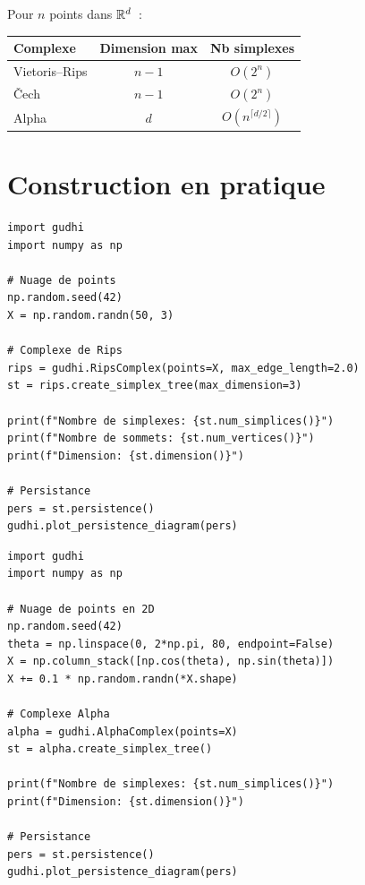 \begin{formules}[title=\textbf{Comparaison des tailles}]
Pour $n$ points dans $\mathbb{R}^d$~:
\begin{center}
\begin{tabular}{lcc}
\toprule
\textbf{Complexe} & \textbf{Dimension max} & \textbf{Nb simplexes} \\
\midrule
Vietoris--Rips & $n - 1$ & $O(2^n)$ \\
\v{C}ech & $n - 1$ & $O(2^n)$ \\
Alpha & $d$ & $O(n^{\lceil d/2 \rceil})$ \\
\bottomrule
\end{tabular}
\end{center}
\end{formules}

\section{Construction en pratique}

\begin{codeblock}[title=\textbf{Complexe de Rips avec GUDHI}]
\begin{verbatim}
import gudhi
import numpy as np

# Nuage de points
np.random.seed(42)
X = np.random.randn(50, 3)

# Complexe de Rips
rips = gudhi.RipsComplex(points=X, max_edge_length=2.0)
st = rips.create_simplex_tree(max_dimension=3)

print(f"Nombre de simplexes: {st.num_simplices()}")
print(f"Nombre de sommets: {st.num_vertices()}")
print(f"Dimension: {st.dimension()}")

# Persistance
pers = st.persistence()
gudhi.plot_persistence_diagram(pers)
\end{verbatim}
\end{codeblock}

\begin{codeblock}[title=\textbf{Complexe Alpha avec GUDHI}]
\begin{verbatim}
import gudhi
import numpy as np

# Nuage de points en 2D
np.random.seed(42)
theta = np.linspace(0, 2*np.pi, 80, endpoint=False)
X = np.column_stack([np.cos(theta), np.sin(theta)])
X += 0.1 * np.random.randn(*X.shape)

# Complexe Alpha
alpha = gudhi.AlphaComplex(points=X)
st = alpha.create_simplex_tree()

print(f"Nombre de simplexes: {st.num_simplices()}")
print(f"Dimension: {st.dimension()}")

# Persistance
pers = st.persistence()
gudhi.plot_persistence_diagram(pers)
\end{verbatim}
\end{codeblock}


